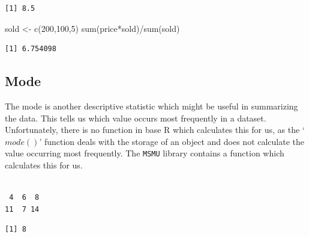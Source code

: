 \documentclass[
  letterpaper,
  DIV=11,
  numbers=noendperiod]{scrreprt}
\newenvironment{Shaded}{\begin{snugshade}}{\end{snugshade}}
\newcommand{\DecValTok}[1]{\textcolor[rgb]{0.68,0.00,0.00}{#1}}
\newcommand{\FunctionTok}[1]{\textcolor[rgb]{0.28,0.35,0.67}{#1}}
\newcommand{\NormalTok}[1]{\textcolor[rgb]{0.00,0.23,0.31}{#1}}
\newcommand{\OtherTok}[1]{\textcolor[rgb]{0.00,0.23,0.31}{#1}}
\newcommand{\SpecialCharTok}[1]{\textcolor[rgb]{0.37,0.37,0.37}{#1}}
\begin{document}
\begin{verbatim}
[1] 8.5
\end{verbatim}

\begin{Shaded}
\begin{Highlighting}[]
\NormalTok{sold }\OtherTok{\textless{}{-}} \FunctionTok{c}\NormalTok{(}\DecValTok{200}\NormalTok{,}\DecValTok{100}\NormalTok{,}\DecValTok{5}\NormalTok{)}
\FunctionTok{sum}\NormalTok{(price}\SpecialCharTok{*}\NormalTok{sold)}\SpecialCharTok{/}\FunctionTok{sum}\NormalTok{(sold)}
\end{Highlighting}
\end{Shaded}

\begin{verbatim}
[1] 6.754098
\end{verbatim}

\subsection{Mode}\label{mode}

The mode is another descriptive statistic which might be useful in
summarizing the data. This tells us which value occurs most frequently
in a dataset. Unfortunately, there is no function in base R which
calculates this for us, as the `\(mode()\)' function deals with the
storage of an object and does not calculate the value occurring most
frequently. The \texttt{MSMU} library contains a function which
calculates this for us.

\begin{Shaded}
\end{Shaded}

\begin{verbatim}

 4  6  8 
11  7 14 
\end{verbatim}

\begin{Shaded}
\end{Shaded}

\begin{verbatim}
[1] 8
\end{verbatim}
\end{document}
